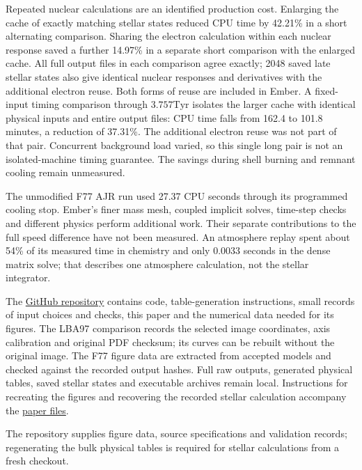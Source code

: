 \documentclass[11pt,letterpaper]{article}
\newcommand{\Tyr}{\mathrm{Tyr}}
\newcommand{\doc}[2]{\href{https://github.com/oklo/ember/blob/codex/atmosphere5000-density-checks/#1}{#2}}
\begin{document}
Repeated nuclear calculations are an identified production cost. Enlarging the
cache of exactly matching stellar states reduced CPU time by 42.21\% in a
short alternating comparison. Sharing the electron calculation within each
nuclear response saved a further 14.97\% in a separate short comparison with
the enlarged cache. All full output files in each comparison agree exactly;
2048 saved late stellar states also give identical nuclear responses and
derivatives with the additional electron reuse. Both forms of reuse are included in Ember.
A fixed-input timing comparison through $3.757\Tyr$ isolates the larger cache with identical
physical inputs and entire output files: CPU time falls from 162.4 to 101.8
minutes, a reduction of 37.31\%. The additional electron reuse was not part
of that pair. Concurrent background load varied, so this single long pair is not
an isolated-machine timing guarantee. The savings during shell burning and
remnant cooling remain unmeasured.

The unmodified F77 AJR run used 27.37 CPU seconds through its programmed
cooling stop. Ember's finer mass mesh, coupled implicit solves, time-step checks
and different physics perform additional work. Their separate contributions
to the full speed difference have not been measured. An atmosphere
replay spent about 54\% of its measured time in chemistry and only 0.0033 seconds
in the dense matrix solve; that describes one atmosphere calculation, not
the stellar integrator.

The \href{https://github.com/oklo/ember}{GitHub repository} contains code,
table-generation instructions, small records of input choices and checks,
this paper and the numerical data needed for its figures. The LBA97 comparison
records the selected image coordinates, axis calibration and original PDF
checksum; its curves can be rebuilt without the original image. The F77 figure data
are extracted from accepted models and checked against the recorded output
hashes. Full raw outputs, generated physical tables, saved stellar states and
executable archives remain local. Instructions for recreating the figures
and recovering the recorded stellar calculation accompany the
\doc{docs/reports/2026-09-12/README.md}{paper files}.

The
repository supplies figure data, source specifications and validation records;
regenerating the bulk physical tables is required for stellar calculations
from a fresh checkout.
\end{document}
